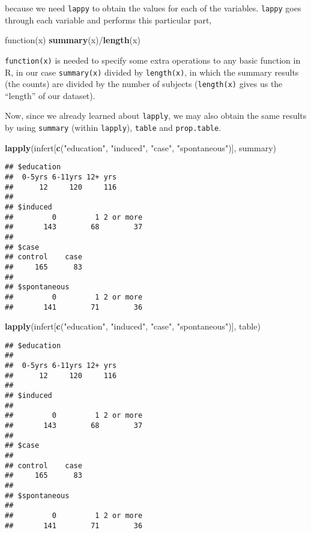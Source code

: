 \documentclass[]{book}
\newenvironment{Shaded}{\begin{snugshade}}{\end{snugshade}}
\newcommand{\KeywordTok}[1]{\textcolor[rgb]{0.13,0.29,0.53}{\textbf{{#1}}}}
\newcommand{\StringTok}[1]{\textcolor[rgb]{0.31,0.60,0.02}{{#1}}}
\newcommand{\NormalTok}[1]{{#1}}
\theoremstyle{definition}
\theoremstyle{definition}
\theoremstyle{remark}
\begin{document}
because we need \texttt{lappy} to obtain the values for each of the
variables. \texttt{lappy} goes through each variable and performs this
particular part,

\begin{Shaded}
\begin{Highlighting}[]
\NormalTok{function(x) }\KeywordTok{summary}\NormalTok{(x)/}\KeywordTok{length}\NormalTok{(x)}
\end{Highlighting}
\end{Shaded}

\texttt{function(x)} is needed to specify some extra operations to any
basic function in R, in our case \texttt{summary(x)} divided by
\texttt{length(x)}, in which the summary results (the counts) are
divided by the number of subjects (\texttt{length(x)} gives us the
``length'' of our dataset).

Now, since we already learned about \texttt{lapply}, we may also obtain
the same results by using \texttt{summary} (within \texttt{lapply}),
\texttt{table} and \texttt{prop.table}.

\begin{Shaded}
\begin{Highlighting}[]
\KeywordTok{lapply}\NormalTok{(infert[}\KeywordTok{c}\NormalTok{(}\StringTok{"education"}\NormalTok{, }\StringTok{"induced"}\NormalTok{, }\StringTok{"case"}\NormalTok{, }\StringTok{"spontaneous"}\NormalTok{)], summary)}
\end{Highlighting}
\end{Shaded}

\begin{verbatim}
## $education
##  0-5yrs 6-11yrs 12+ yrs 
##      12     120     116 
## 
## $induced
##         0         1 2 or more 
##       143        68        37 
## 
## $case
## control    case 
##     165      83 
## 
## $spontaneous
##         0         1 2 or more 
##       141        71        36
\end{verbatim}

\begin{Shaded}
\begin{Highlighting}[]
\KeywordTok{lapply}\NormalTok{(infert[}\KeywordTok{c}\NormalTok{(}\StringTok{"education"}\NormalTok{, }\StringTok{"induced"}\NormalTok{, }\StringTok{"case"}\NormalTok{, }\StringTok{"spontaneous"}\NormalTok{)], table)}
\end{Highlighting}
\end{Shaded}

\begin{verbatim}
## $education
## 
##  0-5yrs 6-11yrs 12+ yrs 
##      12     120     116 
## 
## $induced
## 
##         0         1 2 or more 
##       143        68        37 
## 
## $case
## 
## control    case 
##     165      83 
## 
## $spontaneous
## 
##         0         1 2 or more 
##       141        71        36
\end{verbatim}
\end{document}
